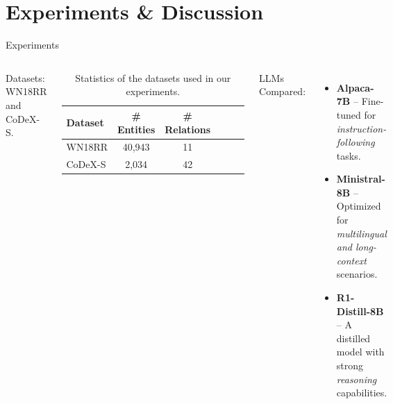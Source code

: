 \documentclass[aspectratio=169,xcolor=dvipsnames]{beamer}
\newcommand{\modelministral}{Ministral-8B\xspace}
\newcommand{\modelalpaca}{Alpaca-7B\xspace}
\newcommand{\modeldeepseek}{R1-Distill-8B\xspace}
\begin{document}

\section{Experiments \& Discussion}
\begin{frame}{Experiments}
    \begin{columns}[c]
        Datasets: WN18RR and CoDeX-S.
        \begin{table}[h]
            \centering
            \begin{tabular}{l c c c c c}
                \toprule
                \textbf{Dataset} & \textbf{\# Entities} & \textbf{\# Relations} \\
                \midrule
                WN18RR           & 40,943               & 11                    \\
                CoDeX-S          & 2,034                & 42                    \\
                \bottomrule
            \end{tabular}
            \caption{Statistics of the datasets used in our experiments.}
            \label{tab:datasets}
        \end{table}

        LLMs Compared:
        \begin{itemize}
            \item \textbf{\modelalpaca} – Fine-tuned for \textit{instruction-following} tasks.
            \item \textbf{\modelministral} – Optimized for \textit{multilingual and long-context} scenarios.
            \item \textbf{\modeldeepseek} – A distilled model with strong \textit{reasoning} capabilities.
        \end{itemize}
    \end{columns}
\end{frame}
\end{document}
